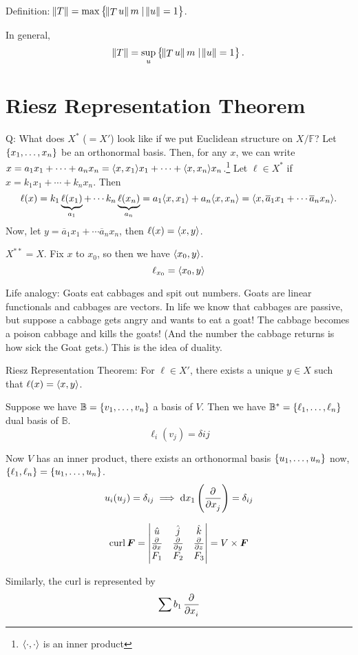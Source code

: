 \documentclass{article}
\DeclareMathOperator{\proj}{proj}
\DeclareMathOperator{\curl}{curl}
\DeclarePairedDelimiter\ip{\langle }{\rangle}
\newcommand{\vm}[1]{\begin{vmatrix} #1 \end{vmatrix}}
\begin{document}
Definition: \(\norm{T} = \max \set{\norm{\mathop T u}m \mid \norm{u} = 1}\).

In general,
\[\norm{T} = \sup_{u} \set{\norm{\mathop T u}m \mid \norm{u} = 1}.\]

\section{Riesz Representation Theorem}
Q: What does \(X^*\) (\(= X'\)) look like if we put Euclidean structure on \(X/\mathbb{F}\)?
Let \(\set{x_1, \dots, x_n}\) be an orthonormal basis.
Then, for any \(x\), we can write \(x = a_1 x_1 + \cdots + a_n x_n = \ip{x, x_1}x_1 + \cdots + \ip{x, x_n}x_n\).\footnote{\(\ip{\cdot, \cdot}\) is an inner product}
Let \(\ell \in X^*\) if \(x = k_1x_1 + \cdots + k_n x_n\).
Then
\[\ell(x) = k_1\underbrace{\ell(x_1)}_{a_1} + \cdots k_n\underbrace{\ell(x_n)}_{a_n} = a_1\ip{x, x_1} + a_n \ip{x, x_n} = \ip{x, \overline a_1x_1 + \cdots \overline a_n x_n}.\]
Now, let \(y = \overline a_1x_1 + \cdots \overline a_n x_n\), then \(\ell(x) = \ip{x, y}\).
\begin{aside}[Recall:]
  \(X^{**} = X\).
  Fix \(x\) to \(x_0\), so then we have \(\ip{x_0, y}\).
  \[\ell_{x_0} = \ip{x_0, y}\]

  Life analogy: Goats eat cabbages and spit out numbers.
  Goats are linear functionals and cabbages are vectors.
  In life we know that cabbages are passive, but suppose a cabbage gets angry and wants to eat a goat!
  The cabbage becomes a poison cabbage and kills the goats! (And the number the cabbage returns is how sick the Goat gets.)
  This is the idea of duality.
\end{aside}


Riesz Representation Theorem: For \(\ell \in X'\), there exists a unique \(y \in X\) such that \(\ell(x) = \ip{x, y}\).

Suppose we have \(\mathbb{B} = \set{v_1, \dots, v_n}\) a basis of \(V\).
Then we have \(\mathbb{B}^* = \set{\ell_1, \dots, \ell_n}\) dual basis of \(\mathbb{B}\).
\[\ell_i(v_j) = \delta{ij}\]

Now \(V\) has an inner product, there exists an orthonormal basis \(\set{u_1, \dots, u_n}\) now, \(\set{\ell_1, \ell_n} = \set{u_1, \dots, u_n}\).
\[u_i(u_j) = \delta_{ij}\implies \dif x_1 \del{\dpd{}{x_j}} = \delta_{ij}\]
\begin{aside}[Recall:]
  \[\curl \bm F = \vm{\hat{u} & \hat{j} & \hat{k}\\\pd{}{x} & \pd{}{y} & \pd{}{z}\\ F_1& F_2 & F_3} = V \times \bm F\]

  Similarly, the curl is represented by
  \[\sum b_1 \dpd{}{x_i}\]
\end{aside}
\end{document}
